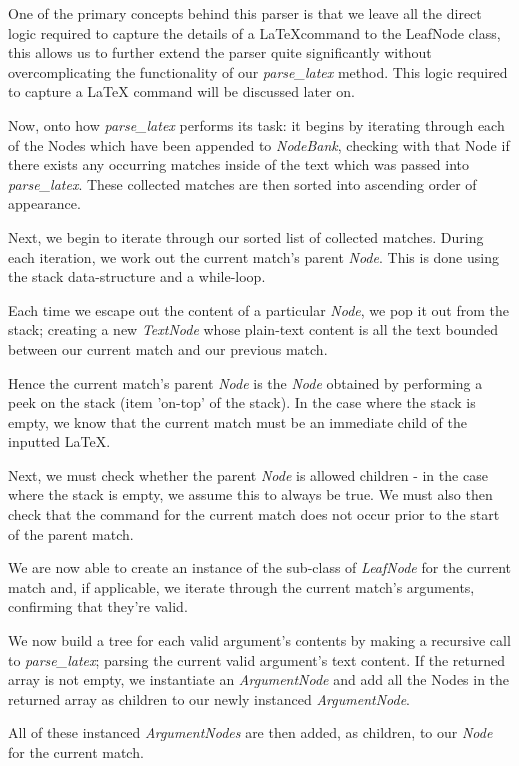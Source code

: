 		One of the primary concepts behind this parser is that we leave all the direct logic required to capture the details of a \LaTeX command to the LeafNode class, this allows us to further extend the parser quite significantly without overcomplicating the functionality of our \textit{parse\_latex} method. This logic required to capture a LaTeX command will be discussed later on.
		
		Now, onto how \textit{parse\_latex} performs its task:
		it begins by iterating through each of the Nodes which have been appended to \textit{NodeBank}, checking with that Node if there exists any occurring matches inside of the text which was passed into \textit{parse\_latex}. These collected matches are then sorted into ascending order of appearance.
		
		Next, we begin to iterate through our sorted list of collected matches.
		During each iteration, we work out the current match's parent \textit{Node}. This is done using the stack data-structure and a while-loop.
		
		Each time we escape out the content of a particular \textit{Node}, we pop it out from the stack; creating a new \textit{TextNode} whose plain-text content is all the text bounded between our current match and our previous match.
		
		Hence the current match's parent \textit{Node} is the \textit{Node} obtained by performing a peek on the stack (item 'on-top' of the stack). In the case where the stack is empty, we know that the current match must be an immediate child of the inputted \LaTeX.
		
		Next, we must check whether the parent \textit{Node} is allowed children - in the case where the stack is empty, we assume this to always be true. We must also then check that the command for the current match does not occur prior to the start of the parent match.

		We are now able to create an instance of the sub-class of \textit{LeafNode} for the current match and, if applicable, we iterate through the current match's arguments, confirming that they're valid.
		
		We now build a tree for each valid argument's contents by making a recursive call to \textit{parse\_latex}; parsing the current valid argument's text content. If the returned array is not empty, we instantiate an \textit{ArgumentNode} and add all the Nodes in the returned array as children to our newly instanced \textit{ArgumentNode}.
		
		All of these instanced \textit{ArgumentNodes} are then added, as children, to our \textit{Node} for the current match.
		
